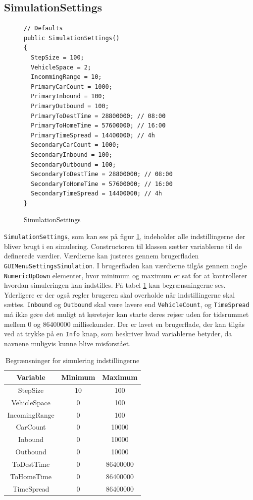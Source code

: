 \subsection{SimulationSettings}
\begin{figure}[H]
\begin{lstlisting} 
// Defaults
public SimulationSettings()
{
  StepSize = 100;
  VehicleSpace = 2;
  IncommingRange = 10;
  PrimaryCarCount = 1000;
  PrimaryInbound = 100;
  PrimaryOutbound = 100;
  PrimaryToDestTime = 28800000; // 08:00
  PrimaryToHomeTime = 57600000; // 16:00
  PrimaryTimeSpread = 14400000; // 4h
  SecondaryCarCount = 1000;
  SecondaryInbound = 100;
  SecondaryOutbound = 100;
  SecondaryToDestTime = 28800000; // 08:00
  SecondaryToHomeTime = 57600000; // 16:00
  SecondaryTimeSpread = 14400000; // 4h
}
\end{lstlisting}
\caption{SimulationSettings}\label{SimulationSettings}
\end{figure}

\texttt{SimulationSettings}, som kan ses på figur \ref{SimulationSettings}, indeholder alle indstillingerne der bliver brugt i en simulering. Constructoren til klassen sætter variablerne til de definerede værdier. Værdierne kan justeres gennem brugerfladen \newline \texttt{GUIMenuSettingsSimulation}. I brugerfladen kan værdierne tilgås gennem nogle \texttt{NumericUpDown} elementer, hvor minimum og maximum er sat for at kontrollerer hvordan simuleringen kan indstilles. På tabel \ref{SimulationLimits} kan begrænsningerne ses. Yderligere er der også regler brugeren skal overholde når indstillingerne skal sættes. \texttt{Inbound} og \texttt{Outbound} skal være lavere end \texttt{VehicleCount}, og \texttt{TimeSpread} må ikke gøre det muligt at køretøjer kan starte deres rejser uden for tidsrummet mellem 0 og 86400000 millisekunder. Der er lavet en brugerflade, der kan tilgås ved at trykke på en \texttt{Info} knap, som beskriver hvad variablerne betyder, da navnene muligvis kunne blive misforstået.

\begin{table}[H]
\centering
\begin{tabular}{| c | c | c |}
  \hline
Variable & Minimum & Maximum \\
  \hline
StepSize & 10 & 100 \\
  \hline
VehicleSpace & 0 & 100 \\
  \hline
IncomingRange & 0 & 100 \\
  \hline
CarCount & 0 & 10000 \\
  \hline
Inbound & 0 & 10000 \\
  \hline
Outbound & 0 & 10000 \\
  \hline
ToDestTime & 0 & 86400000 \\
  \hline
ToHomeTime & 0 & 86400000 \\
  \hline
TimeSpread & 0 & 86400000 \\
  \hline
\end{tabular}
\caption{Begrænsninger for simulering indstillingerne}\label{SimulationLimits}
\end{table}

